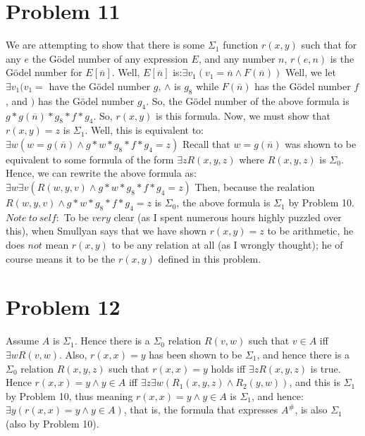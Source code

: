 \documentclass{article}
\theoremstyle{definition}
\begin{document}
\section*{Problem 11}
We are attempting to show that there is some $\Sigma_1$ function $r(x,y)$ such that for any $e$ the Gödel number of any expression $E$, and any 
number $n$, $r(e,n)$ is the Gödel number for $E[\overline n]$. Well, $E[\overline n]$ is:\newline $\exists v_1(v_1=\overline n\wedge F(\overline n))$
\newline Well, we let $\exists v_1(v_1=$ have the Gödel number $g$, $\wedge$ is $g_8$ while $F(\overline n)$ has the Gödel number $f$, and $)$ has the 
Gödel number $g_4$. So, the Gödel number of the above formula is $g*g(\overline n)*g_8*f*g_4$. So, $r(x,y)$ is this formula. Now, we must show that 
$r(x,y)=z$ is $\Sigma_1$. Well, this is equivalent to:\newline $\exists w(w=g(\overline n)\wedge g*w*g_8*f*g_4=z)$\newline
Recall that $w=g(\overline n)$ was shown to be equivalent to some formula of the form $\exists zR(x,y,z)$ where $R(x,y,z)$ is $\Sigma_0$. 
Hence, we can rewrite the above formula as:
\newline $\exists w\exists v(R(w,y,v)\wedge g*w*g_8*f*g_4=z)$\newline
Then, because the realation $R(w,y,v)\wedge g*w*g_8*f*g_4=z$ is $\Sigma_0$, the above formula is $\Sigma_1$ by Problem 10.\newline
$Note\ to\ self:$ To be $very$ clear (as I spent numerous hours highly puzzled over this), when Smullyan says that we have shown $r(x,y)=z$ 
to be arithmetic,
 he does $not$ mean $r(x,y)$ to be any relation at all (as I wrongly thought); he of course means it to be the $r(x,y)$ defined in this problem.
\section*{Problem 12}                                                                                                      
Assume $A$ is $\Sigma_1$. Hence there is a $\Sigma_0$ relation $R(v,w)$ such that $v\in A$ iff $\exists wR(v,w)$. Also, $r(x,x)=y$ has been shown to be 
$\Sigma_1$, and hence there is a $\Sigma_0$ relation $R(x,y,z)$ such that $r(x,x)=y$ holds iff $\exists zR(x,y,z)$ is true. Hence $r(x,x)=y\wedge y\in A$ 
iff $\exists z\exists w(R_1(x,y,z)\wedge R_2(y,w))$, and this is $\Sigma_1$ by Problem 10, thus meaning $r(x,x)=y\wedge y\in A$ is $\Sigma_1$, and hence:
\newline $\exists y(r(x,x)=y\wedge y\in A)$, that is, the formula that expresses $A^\#$, is also $\Sigma_1$ (also by Problem 10).
\end{document}
